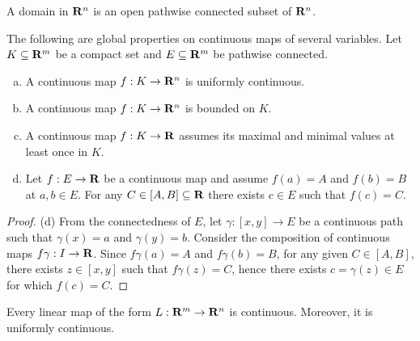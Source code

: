 \begin{definition}[Domain]\label{def: domain}
  A domain in \(\mathbf{R}^n\) is an open pathwise connected subset of \(\mathbf{R}^n\).
\end{definition}

\begin{proposition}
  \label{prop:global-properties-continuous-on-compact}
  The following are global properties on continuous maps of several
  variables. Let \(K \subseteq \mathbf{R}^m\) be a compact set and \(E \subseteq \mathbf{R}^m\)
  be pathwise connected.
  \begin{enumerate}[(a)]
    \item A continuous map \(f: K \to \mathbf{R}^n\) is uniformly continuous.
    \item A continuous map \(f: K \to \mathbf{R}^n\) is bounded on \(K\).
    \item A continuous map \(f: K \to \mathbf{R}\) assumes its maximal and minimal
      values at least once in \(K\).
    \item Let \(f: E \to \mathbf{R}\) be a continuous map and assume \(f(a) = A\) and
      \(f(b) = B\) at \(a, b \in E\). For any \(C \in [A, B] \subseteq \mathbf{R}\)
      there exists \(c \in E\) such that \(f(c) = C\).
  \end{enumerate}
\end{proposition}

\begin{proof}
  (d) From the connectedness of \(E\), let \(\gamma: [x, y] \to E\) be a
  continuous path such that \(\gamma(x) = a\) and \(\gamma(y) = b\). Consider
  the composition of continuous maps \(f  \gamma: I \to \mathbf{R}\). Since \(f
   \gamma(a) = A\) and \(f  \gamma(b) = B\), for any given \(C \in [A,
  B]\), there exists \(z \in [x, y]\) such that \(f  \gamma(z) = C\), hence
  there exists \(c = \gamma(z) \in E\) for which \(f(c) = C\).
\end{proof}

\begin{proposition}\label{prop: linear-continuous}
  Every linear map of the form \(L: \mathbf{R}^m \to \mathbf{R}^n\) is continuous. Moreover, it
  is uniformly continuous.
\end{proposition}

